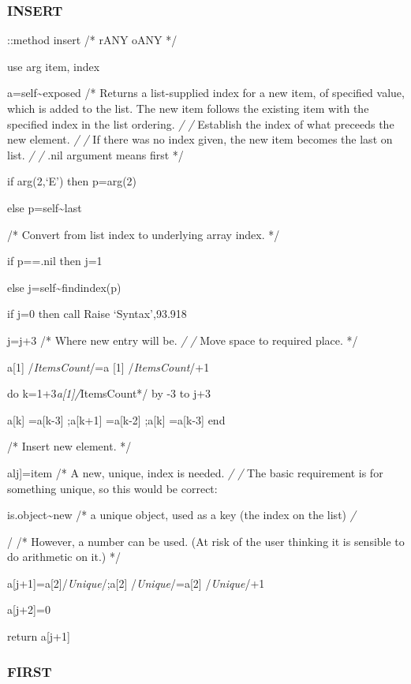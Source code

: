 \hypertarget{insert}{%
\subsubsection{INSERT}\label{insert}}

::method insert /* rANY oANY */

use arg item, index

a=self\textasciitilde exposed /* Returns a list-supplied index for a new
item, of specified value, which is added to the list. The new item
follows the existing item with the specified index in the list ordering.
\emph{/ /} Establish the index of what preceeds the new element. \emph{/
/} If there was no index given, the new item becomes the last on list.
\emph{/ /} .nil argument means first */

if arg(2,`E') then p=arg(2)

else p=self\textasciitilde last

/* Convert from list index to underlying array index. */

if p==.nil then j=1

else j=self\textasciitilde findindex(p)

if j=0 then call Raise `Syntax',93.918

j=j+3 /* Where new entry will be. \emph{/ /} Move space to required
place. */

a{[}1{]} /\emph{ItemsCount}/=a {[}1{]} /\emph{ItemsCount}/+1

do k=1+3\emph{a{[}1{]}/}ItemsCount*/ by -3 to j+3

a{[}k{]} =a{[}k-3{]} ;a{[}k+1{]} =a{[}k-2{]} ;a{[}k{]} =a{[}k-3{]} end

/* Insert new element. */

alj{]}=item /* A new, unique, index is needed. \emph{/ /} The basic
requirement is for something unique, so this would be correct:

is.object\textasciitilde new /* a unique object, used as a key (the
index on the list) \emph{/ }

/ /* However, a number can be used. (At risk of the user thinking it is
sensible to do arithmetic on it.) */

a{[}j+1{]}=a{[}2{]}/\emph{Unique}/;a{[}2{]} /\emph{Unique}/=a{[}2{]}
/\emph{Unique}/+1

a{[}j+2{]}=0

return a{[}j+1{]}

\hypertarget{first}{%
\subsubsection{FIRST}\label{first}}


